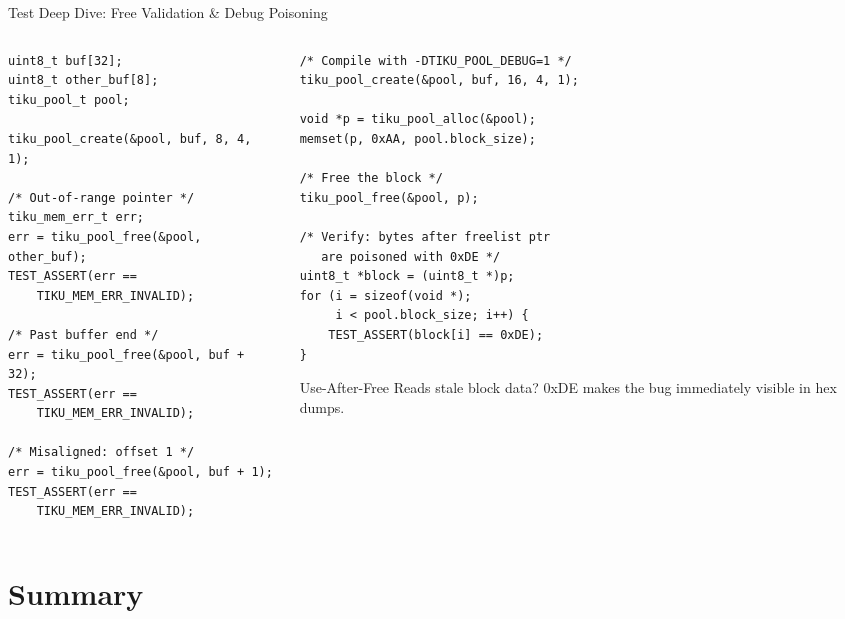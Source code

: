 \documentclass[aspectratio=169, 10pt]{beamer}
\begin{document}
\begin{frame}[fragile]{Test Deep Dive: Free Validation \& Debug Poisoning}
\begin{columns}[T]
\begin{column}{0.48\textwidth}
\begin{lstlisting}[style=cstyle, title={Free validation test}]
uint8_t buf[32];
uint8_t other_buf[8];
tiku_pool_t pool;

tiku_pool_create(&pool, buf, 8, 4, 1);

/* Out-of-range pointer */
tiku_mem_err_t err;
err = tiku_pool_free(&pool, other_buf);
TEST_ASSERT(err ==
    TIKU_MEM_ERR_INVALID);

/* Past buffer end */
err = tiku_pool_free(&pool, buf + 32);
TEST_ASSERT(err ==
    TIKU_MEM_ERR_INVALID);

/* Misaligned: offset 1 */
err = tiku_pool_free(&pool, buf + 1);
TEST_ASSERT(err ==
    TIKU_MEM_ERR_INVALID);
\end{lstlisting}
\end{column}

\begin{column}{0.48\textwidth}
\begin{lstlisting}[style=cstyle, title={Debug poisoning test}]
/* Compile with -DTIKU_POOL_DEBUG=1 */
tiku_pool_create(&pool, buf, 16, 4, 1);

void *p = tiku_pool_alloc(&pool);
memset(p, 0xAA, pool.block_size);

/* Free the block */
tiku_pool_free(&pool, p);

/* Verify: bytes after freelist ptr
   are poisoned with 0xDE */
uint8_t *block = (uint8_t *)p;
for (i = sizeof(void *);
     i < pool.block_size; i++) {
    TEST_ASSERT(block[i] == 0xDE);
}
\end{lstlisting}

\vspace{0.3em}
\begin{alertblock}{Use-After-Free}
Reads stale block data? 0xDE makes the bug
immediately visible in hex dumps.
\end{alertblock}
\end{column}
\end{columns}
\end{frame}

\section{Summary}
\end{document}
